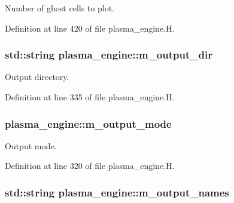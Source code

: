 Number of ghost cells to plot. 



Definition at line 420 of file plasma\+\_\+engine.\+H.

\subsubsection[{\texorpdfstring{m\+\_\+output\+\_\+dir}{m_output_dir}}]{\setlength{\rightskip}{0pt plus 5cm}std\+::string plasma\+\_\+engine\+::m\+\_\+output\+\_\+dir\hspace{0.3cm}{\ttfamily [protected]}}\hypertarget{classplasma__engine_ab12f31677d50f5edd0077b0f41dbb6aa}{}\label{classplasma__engine_ab12f31677d50f5edd0077b0f41dbb6aa}


Output directory. 



Definition at line 335 of file plasma\+\_\+engine.\+H.

\subsubsection[{\texorpdfstring{m\+\_\+output\+\_\+mode}{m_output_mode}}]{ plasma\+\_\+engine\+::m\+\_\+output\+\_\+mode\hspace{0.3cm}{\ttfamily [protected]}}\hypertarget{classplasma__engine_aed0bb2dd44f49be95fde9dd8d2952ed6}{}\label{classplasma__engine_aed0bb2dd44f49be95fde9dd8d2952ed6}


Output mode. 



Definition at line 320 of file plasma\+\_\+engine.\+H.

\subsubsection[{\texorpdfstring{m\+\_\+output\+\_\+names}{m_output_names}}]{\setlength{\rightskip}{0pt plus 5cm}std\+::string plasma\+\_\+engine\+::m\+\_\+output\+\_\+names\hspace{0.3cm}{\ttfamily [protected]}}\hypertarget{classplasma__engine_a8af0830c8c4262753dad80b8879d3f3d}{}\label{classplasma__engine_a8af0830c8c4262753dad80b8879d3f3d}


